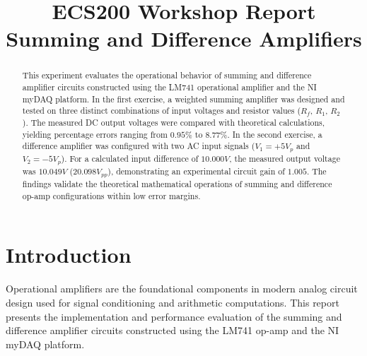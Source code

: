 \documentclass[conference]{IEEEtran}
\begin{document}
\title{ECS200 Workshop Report\\
{\footnotesize Summing and Difference Amplifiers}}

\author{
\and
{}
}

\maketitle

\begin{abstract}
This experiment evaluates the operational behavior of summing and difference amplifier circuits constructed using the LM741 operational amplifier and the NI myDAQ platform. In the first exercise, a weighted summing amplifier was designed and tested on three distinct combinations of input voltages and resistor values ($R_f$, $R_1$, $R_2$). The measured DC output voltages were compared with theoretical calculations, yielding percentage errors ranging from $0.95\%$ to $8.77\%$. In the second exercise, a difference amplifier was configured with two AC input signals ($V_1 = +5{ V}_p$ and $V_2 = -5{ V}_p$). For a calculated input difference of $10.000{ V}$, the measured output voltage was $10.049{ V}$ ($20.098{ V}_{pp}$), demonstrating an experimental circuit gain of $1.005$. The findings validate the theoretical mathematical operations of summing and difference op-amp configurations within low error margins.  
\end{abstract}



\section{Introduction}
Operational amplifiers are the foundational components in modern analog circuit design used for signal conditioning and arithmetic computations\cite{b3}. This report presents the implementation and performance evaluation of the summing and difference amplifier circuits constructed using the LM741 op-amp and the NI myDAQ platform\cite{b1,b3}.
\end{document}
